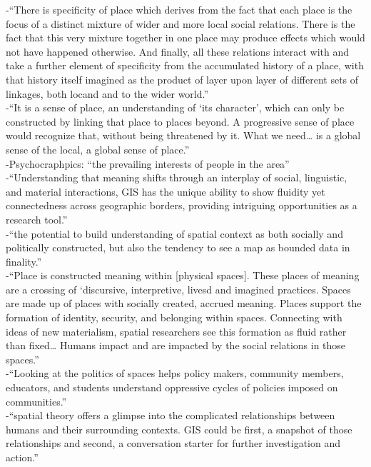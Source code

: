 -{\color{orange}“There is specificity of place which derives from the fact that each place is the focus of a distinct mixture of wider and more local social relations. There is the fact that this very mixture together in one place may produce effects which would not have happened otherwise. And finally, all these relations interact with and take a further element of specificity from the accumulated history of a place, with that history itself imagined as the product of layer upon layer of different sets of linkages, both locand and to the wider world.”
}\cite{MasseyD1991}\\
-{\color{orange}“It is a sense of place, an understanding of ‘its character’, which can only be constructed by linking that place to places beyond. A progressive sense of place would recognize that, without being threatened by it. What we need… is a global sense of the local, a global sense of place.”}\cite{MasseyD1991}\\
-{\color{orange}Psychocraphpics: ``the prevailing interests of people in the area''}\cite{Chiappinelli2020}\\
-{\color{orange}“Understanding that meaning shifts through an interplay of social, linguistic, and material interactions, GIS has the unique ability to show fluidity yet connectedness across geographic borders, providing intriguing opportunities as a research tool.”\cite{McQueenBaker2019}}\\
-{\color{orange}“the potential to build understanding of spatial context as both socially and politically constructed, but also the tendency to see a map as bounded data in finality.”\cite{McQueenBaker2019}}\\
-{\color{orange}“Place is constructed meaning within [physical spaces]. These places of meaning are a crossing of ‘discursive, interpretive, livesd and imagined practices. Spaces are made up of places with socially created, accrued meaning. Places support the formation of identity, security, and belonging within spaces. Connecting with ideas of new materialism, spatial researchers see this formation as fluid rather than fixed… Humans impact and are impacted by the social relations in those spaces.”\cite{McQueenBaker2019}}\\
-{\color{orange}“Looking at the politics of spaces helps policy makers, community members, educators, and students understand oppressive cycles of policies imposed on communities.”\cite{McQueenBaker2019}}\\
-{\color{orange}“spatial theory offers a glimpse into the complicated relationships between humans and their surrounding contexts. GIS could be first, a snapshot of those relationships and second, a conversation starter for further investigation and action.”\cite{McQueenBaker2019}}\\
